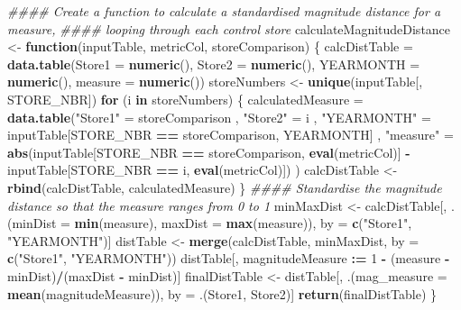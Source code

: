 \documentclass[
]{article}
\newenvironment{Shaded}{\begin{snugshade}}{\end{snugshade}}
\newcommand{\CommentTok}[1]{\textcolor[rgb]{0.56,0.35,0.01}{\textit{#1}}}
\newcommand{\ControlFlowTok}[1]{\textcolor[rgb]{0.13,0.29,0.53}{\textbf{#1}}}
\newcommand{\DataTypeTok}[1]{\textcolor[rgb]{0.13,0.29,0.53}{#1}}
\newcommand{\DecValTok}[1]{\textcolor[rgb]{0.00,0.00,0.81}{#1}}
\newcommand{\ErrorTok}[1]{\textcolor[rgb]{0.64,0.00,0.00}{\textbf{#1}}}
\newcommand{\KeywordTok}[1]{\textcolor[rgb]{0.13,0.29,0.53}{\textbf{#1}}}
\newcommand{\NormalTok}[1]{#1}
\newcommand{\OperatorTok}[1]{\textcolor[rgb]{0.81,0.36,0.00}{\textbf{#1}}}
\newcommand{\StringTok}[1]{\textcolor[rgb]{0.31,0.60,0.02}{#1}}
\begin{document}
\begin{Shaded}
\begin{Highlighting}[]
\CommentTok{#### Create a function to calculate a standardised magnitude distance for a measure,}
\CommentTok{#### looping through each control store}
\NormalTok{calculateMagnitudeDistance <-}\StringTok{ }\ControlFlowTok{function}\NormalTok{(inputTable, metricCol, storeComparison) \{}
\NormalTok{calcDistTable =}\StringTok{ }\KeywordTok{data.table}\NormalTok{(}\DataTypeTok{Store1 =} \KeywordTok{numeric}\NormalTok{(), }\DataTypeTok{Store2 =} \KeywordTok{numeric}\NormalTok{(), }\DataTypeTok{YEARMONTH =}
\KeywordTok{numeric}\NormalTok{(), }\DataTypeTok{measure =} \KeywordTok{numeric}\NormalTok{())}
\NormalTok{  storeNumbers <-}\StringTok{ }\KeywordTok{unique}\NormalTok{(inputTable[, STORE_NBR])}
  \ControlFlowTok{for}\NormalTok{ (i }\ControlFlowTok{in}\NormalTok{ storeNumbers) \{}
\NormalTok{  calculatedMeasure =}\StringTok{ }\KeywordTok{data.table}\NormalTok{(}\StringTok{"Store1"}\NormalTok{ =}\StringTok{ }\NormalTok{storeComparison}
\NormalTok{                                 , }\StringTok{"Store2"}\NormalTok{ =}\StringTok{ }\NormalTok{i}
\NormalTok{                                 , }\StringTok{"YEARMONTH"}\NormalTok{ =}\StringTok{ }\NormalTok{inputTable[STORE_NBR }\OperatorTok{==}
\NormalTok{storeComparison, YEARMONTH]}
\NormalTok{                                 , }\StringTok{"measure"}\NormalTok{ =}\StringTok{ }\KeywordTok{abs}\NormalTok{(inputTable[STORE_NBR }\OperatorTok{==}
\NormalTok{storeComparison, }\KeywordTok{eval}\NormalTok{(metricCol)]}
                                                   \OperatorTok{-}\StringTok{ }\NormalTok{inputTable[STORE_NBR }\OperatorTok{==}\StringTok{ }\NormalTok{i,}
\KeywordTok{eval}\NormalTok{(metricCol)])}
\NormalTok{                                  )}
\NormalTok{    calcDistTable <-}\StringTok{ }\KeywordTok{rbind}\NormalTok{(calcDistTable, calculatedMeasure)}
\NormalTok{\}}
\CommentTok{#### Standardise the magnitude distance so that the measure ranges from 0 to 1}
\NormalTok{  minMaxDist <-}\StringTok{ }\NormalTok{calcDistTable[, .(}\DataTypeTok{minDist =} \KeywordTok{min}\NormalTok{(measure), }\DataTypeTok{maxDist =} \KeywordTok{max}\NormalTok{(measure)),}
\NormalTok{by =}\StringTok{ }\KeywordTok{c}\NormalTok{(}\StringTok{"Store1"}\NormalTok{, }\StringTok{"YEARMONTH"}\NormalTok{)]}
\NormalTok{  distTable <-}\StringTok{ }\KeywordTok{merge}\NormalTok{(calcDistTable, minMaxDist, }\DataTypeTok{by =} \KeywordTok{c}\NormalTok{(}\StringTok{"Store1"}\NormalTok{, }\StringTok{"YEARMONTH"}\NormalTok{))}
\NormalTok{  distTable[, magnitudeMeasure }\OperatorTok{:}\ErrorTok{=}\StringTok{ }\DecValTok{1} \OperatorTok{-}\StringTok{ }\NormalTok{(measure }\OperatorTok{-}\StringTok{ }\NormalTok{minDist)}\OperatorTok{/}\NormalTok{(maxDist }\OperatorTok{-}\StringTok{ }\NormalTok{minDist)]}
\NormalTok{  finalDistTable <-}\StringTok{ }\NormalTok{distTable[, .(}\DataTypeTok{mag_measure =} \KeywordTok{mean}\NormalTok{(magnitudeMeasure)), by =}
\NormalTok{.(Store1, Store2)]}
  \KeywordTok{return}\NormalTok{(finalDistTable)}
\NormalTok{\}}
\end{Highlighting}
\end{Shaded}
\end{document}
